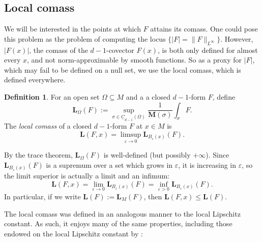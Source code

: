 \documentclass[reqno,11pt]{amsart}
\newcommand{\Chain}{\underline C}
\newcommand{\Mass}{\mathbf M}
\newcommand{\Comass}{\mathbf L}
\newcommand{\dfn}[1]{\emph{#1}\index{#1}}
\theoremstyle{definition}
\newtheorem{definition}[theorem]{Definition}
\numberwithin{equation}{section}
\begin{document}
\subsection{Local comass}
We will be interested in the points at which $F$ attains its comass.
One could pose this problem as the problem of computing the locus $\{|F| = \|F\|_{L^\infty}\}$.
However, $|F(x)|$, the comass of the $d - 1$-covector $F(x)$, is both only defined for almost every $x$, and not norm-approximable by smooth functions.
So as a proxy for $|F|$, which may fail to be defined on a null set, we use the local comass, which is defined everywhere.

\begin{definition}
For an open set $\Omega \subseteq M$ and a a closed $d - 1$-form $F$, define 
$$\Comass_\Omega(F) := \sup_{\sigma \in \Chain_{d - 1}(\Omega)} \frac{1}{\Mass(\sigma)} \int_\sigma F.$$
The \dfn{local comass} of a closed $d - 1$-form $F$ at $x \in M$ is 
$$\Comass(F, x) = \limsup_{\varepsilon \to 0} \Comass_{B_\varepsilon(x)}(F).$$
\end{definition}

By the trace theorem, $\Comass_\Omega(F)$ is well-defined (but possibly $+\infty$).
Since $\Comass_{B_\varepsilon(x)}(F)$ is a supremum over a set which grows in $\varepsilon$, it is increasing in $\varepsilon$, so the limit superior is actually a limit and an infimum:
$$\Comass(F, x) = \lim_{\varepsilon \to 0} \Comass_{B_\varepsilon(x)}(F) = \inf_{\varepsilon > 0} \Comass_{B_\varepsilon(x)}(F).$$
In particular, if we write $\Comass(F) := \Comass_M(F)$, then $\Comass(F, x) \leq \Comass(F)$.

The local comass was defined in an analogous manner to the local Lipschitz constant.
As such, it enjoys many of the same properties, including those endowed on the local Lipschitz constant by \cite[Lemma 4.3]{Crandall2008}:
\end{document}
